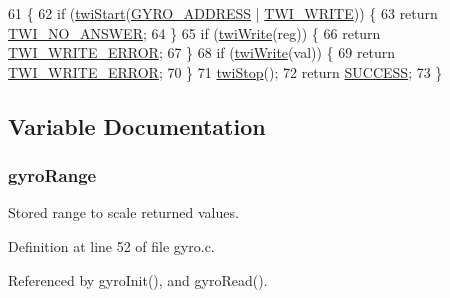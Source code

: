 \begin{DoxyCode}
61                                               \{
62     \textcolor{keywordflow}{if} (\hyperlink{group__twi_ga4f86edc73f37ce976ea2225519ab31cd}{twiStart}(\hyperlink{group__config_ga8ed1f343e82440b4ef900e5fe42d74f0}{GYRO\_ADDRESS} | \hyperlink{group__twi_ga3b68e8e777b71520f9dbfac733774d5f}{TWI\_WRITE})) \{
63         \textcolor{keywordflow}{return} \hyperlink{group__error_gga2c3e4bb40f36b262a5214e2da2bca9c5a04d5943ba652af2205c88b247e0c659c}{TWI\_NO\_ANSWER};
64     \}
65     \textcolor{keywordflow}{if} (\hyperlink{group__twi_gaf42e50aaf4a9794d3a2c000e7b407887}{twiWrite}(reg)) \{
66         \textcolor{keywordflow}{return} \hyperlink{group__error_gga2c3e4bb40f36b262a5214e2da2bca9c5ac0e3b3463dcaf220e54794b4711708c9}{TWI\_WRITE\_ERROR};
67     \}
68     \textcolor{keywordflow}{if} (\hyperlink{group__twi_gaf42e50aaf4a9794d3a2c000e7b407887}{twiWrite}(val)) \{
69         \textcolor{keywordflow}{return} \hyperlink{group__error_gga2c3e4bb40f36b262a5214e2da2bca9c5ac0e3b3463dcaf220e54794b4711708c9}{TWI\_WRITE\_ERROR};
70     \}
71     \hyperlink{group__twi_gabf581270e9537a60e2d8cf3d2c1543d1}{twiStop}();
72     \textcolor{keywordflow}{return} \hyperlink{group__error_gga2c3e4bb40f36b262a5214e2da2bca9c5ac7f69f7c9e5aea9b8f54cf02870e2bf8}{SUCCESS};
73 \}
\end{DoxyCode}


\subsection{Variable Documentation}
\hypertarget{group__gyro_gaa2ed27a7e4a0d8a5f492ef6059a04615}{
\subsubsection[{gyro\-Range}]{ gyro\-Range}}\label{group__gyro_gaa2ed27a7e4a0d8a5f492ef6059a04615}


Stored range to scale returned values. 



Definition at line 52 of file gyro.\-c.



Referenced by gyro\-Init(), and gyro\-Read().


